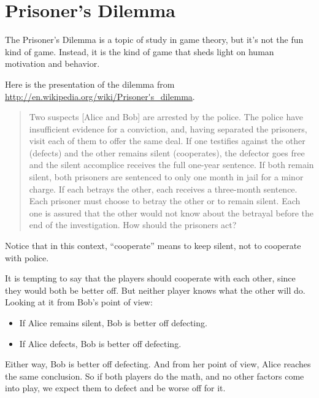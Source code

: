 \documentclass[10pt]{book}
\begin{document}
\section{Prisoner's Dilemma}
\label{prisoners}

The Prisoner's Dilemma is a topic of study in game theory, but
it's not the fun kind of game.  Instead, it is the kind of game
that sheds light on human motivation and behavior.

Here is the presentation of the dilemma from
\url{http://en.wikipedia.org/wiki/Prisoner's_dilemma}.

\begin{quote}
Two suspects [Alice and Bob] are arrested by the police.  The police
have insufficient evidence for a conviction, and, having separated the
prisoners, visit each of them to offer the same deal.  If one
testifies against the other (defects) and the
other remains silent (cooperates), the defector goes free and the
silent accomplice receives the full one-year sentence.  If both remain
silent, both prisoners are sentenced to only one month in jail for a
minor charge. If each betrays the other, each receives a three-month
sentence. Each prisoner must choose to betray the other or to remain
silent. Each one is assured that the other would not know about the
betrayal before the end of the investigation.  How should the
prisoners act?
\end{quote}

Notice that in this context, ``cooperate'' means to keep silent,
not to cooperate with police.

It is tempting to say that the players should cooperate with each
other, since they would both be better off.  But neither player knows
what the other will do.  Looking at it from Bob's point of view:

\begin{itemize}

\item If Alice remains silent, Bob is better off defecting.

\item If Alice defects, Bob is better off defecting.

\end{itemize}

Either way, Bob is better off defecting.  And from her point of view,
Alice reaches the same conclusion.  So if both players do the math,
and no other factors come into play, we expect them to defect and be
worse off for it.
\end{document}

